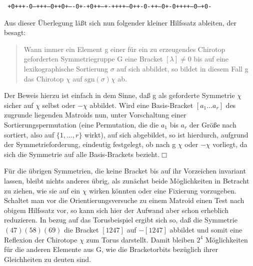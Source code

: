 \centerline{\small\tt
+0+++-0--+++--0++0+----0+-+0++---+-++++---0++-0-++--0+-0++++---0---+0-
}\vskip4mm

Aus dieser Überlegung läßt sich nun folgender kleiner Hilfssatz ableiten, der
besagt:
\begin{quote}
Wann immer ein Element g einer für ein zu erzeugendes Chirotop geforderten
Symmetriegruppe G eine Bracket $[\lambda]\neq 0$ bis auf eine lexikographische
Sortierung $\sigma$ auf sich abbildet, so bildet in diesem Fall g das
Chirotop $\chi$ auf $\mbox{sgn}(\sigma)\chi$ ab.
\end{quote}
Der Beweis hierzu ist einfach in dem Sinne, daß g als geforderte Symmetrie
$\chi$ sicher auf $\chi$ selbst oder $-\chi$ abbildet. Wird eine Basis-Bracket
$[a_1\ldots a_r]$ des zugrunde liegenden Matroids nun, unter Vorschaltung einer
Sortierungspermutation (eine Permutation, die die $a_1$ bis $a_r$ der Größe
nach sortiert, also auf $\{1,\ldots,r\}$ wirkt), auf sich abgebildet, so ist
hierdurch, aufgrund der Symmetrieforderung, eindeutig festgelegt, ob nach g
$\chi$ oder $-\chi$ vorliegt, da sich die Symmetrie auf alle Basis-Brackets
bezieht.$\Box$

Für die übrigen Symmetrien, die keine Bracket bis auf ihr Vorzeichen
invariant lassen, bleibt nichts anderes übrig, als zunächst beide
Möglichkeiten in Betracht zu ziehen, wie sie auf ein $\chi$ wirken könnten
oder eine Fixierung vorzugeben. Schaltet man vor die Orientierungsversuche zu
einem Matroid einen Test nach obigem Hilfssatz vor, so kann sich hier der
Aufwand aber schon erheblich reduzieren. In bezug auf das Torusbeispiel ergibt
sich so, daß die Symmetrie $(47)(58)(69)$ die Bracket $[1247]$ auf $-[1247]$
abbildet und somit eine Reflexion der Chirotope $\chi$ zum Torus darstellt.
Damit bleiben $2^4$ Möglichkeiten für die anderen Elemente aus G, wie die
Bracketorbits bezüglich ihrer Gleichheiten zu deuten sind.

